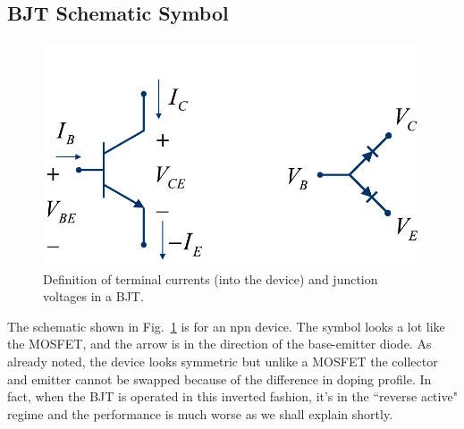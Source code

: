 \subsection{BJT Schematic Symbol}
\begin{figure}[tb]
\begin{center}
\includegraphics[width=.6\columnwidth]{slide5_bjt_schematic}
\end{center}
\caption{Definition of terminal currents (into the device) and junction voltages in a BJT.} \label{fig:slide5_bjt_schematic}
\end{figure}

The schematic shown in Fig.~\ref{fig:slide5_bjt_schematic} is for an npn device.  The symbol looks a lot like the MOSFET, and the arrow is in the direction of the base-emitter diode.  As already noted, the device looks symmetric but unlike a MOSFET the collector and emitter cannot be swapped because of the difference in doping profile. In fact, when the BJT is operated in this inverted fashion, it's in the ``reverse active" regime and the performance is much worse as we shall explain shortly. 
